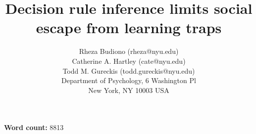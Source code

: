 \documentclass[11pt]{article} %
\title{Decision rule inference limits social escape from learning traps}
\author{
{Rheza Budiono (rheza@nyu.edu)}\\
{Catherine A. Hartley (cate@nyu.edu)}\\ 
{Todd M. Gureckis (todd.gureckis@nyu.edu)} \\
  Department of Psychology, 6 Washington Pl \\
  New York, NY 10003 USA
}
\begin{document}
\maketitle
\textbf{Word count: } 8813
\end{document}
